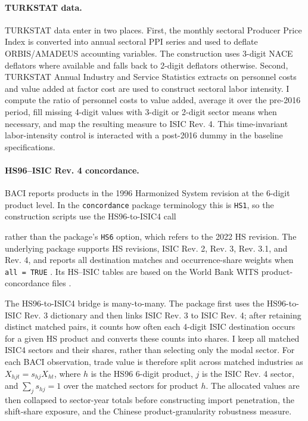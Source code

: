 ﻿\documentclass[12pt]{article}
\begin{document}
\paragraph{TURKSTAT data.} TURKSTAT data enter in two places. First, the monthly sectoral Producer Price Index is converted into annual sectoral PPI series and used to deflate ORBIS/AMADEUS accounting variables. The construction uses 3-digit NACE deflators where available and falls back to 2-digit deflators otherwise. Second, TURKSTAT Annual Industry and Service Statistics extracts on personnel costs and value added at factor cost are used to construct sectoral labor intensity. I compute the ratio of personnel costs to value added, average it over the pre-2016 period, fill missing 4-digit values with 3-digit or 2-digit sector means when necessary, and map the resulting measure to ISIC Rev. 4. This time-invariant labor-intensity control is interacted with a post-2016 dummy in the baseline specifications.

\paragraph{HS96--ISIC Rev. 4 concordance.}\hfill\par
\label{app:hs_isic_concordance}
\noindent BACI reports products in the 1996 Harmonized System revision at the 6-digit product level. In the \texttt{concordance} package terminology this is \texttt{HS1}, so the construction scripts use the HS96-to-ISIC4 call
\begin{center}
\begin{minipage}{0.94\textwidth}
\footnotesize\ttfamily\raggedright
{}
\end{minipage}
\end{center}
rather than the package's \texttt{HS6} option, which refers to the 2022 HS revision. The underlying package supports HS revisions, ISIC Rev. 2, Rev. 3, Rev. 3.1, and Rev. 4, and reports all destination matches and occurrence-share weights when \texttt{all = TRUE} \parencite{liaoConcordanceProductConcordance2020}. Its HS--ISIC tables are based on the World Bank WITS product-concordance files \parencite{worldBankWITSProductConcordance2026}.

The HS96-to-ISIC4 bridge is many-to-many. The package first uses the HS96-to-ISIC Rev. 3 dictionary and then links ISIC Rev. 3 to ISIC Rev. 4; after retaining distinct matched pairs, it counts how often each 4-digit ISIC destination occurs for a given HS product and converts these counts into shares. I keep all matched ISIC4 sectors and their shares, rather than selecting only the modal sector. For each BACI observation, trade value is therefore split across matched industries as $X_{hjt}=s_{hj}X_{ht}$, where $h$ is the HS96 6-digit product, $j$ is the ISIC Rev. 4 sector, and $\sum_j s_{hj}=1$ over the matched sectors for product $h$. The allocated values are then collapsed to sector-year totals before constructing import penetration, the shift-share exposure, and the Chinese product-granularity robustness measure.
\end{document}
